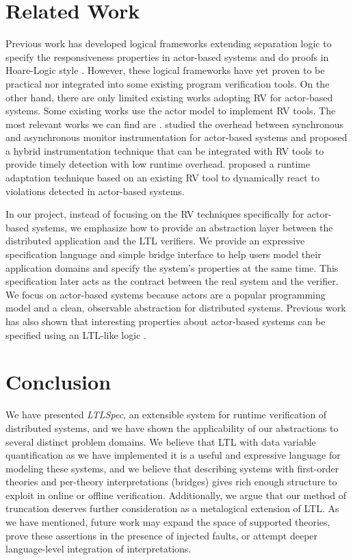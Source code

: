 \documentclass[format=acmsmall, nonacm=true, review=true, screen=true]{acmart}
\newcommand{\ltlspec}{\textit{LTLSpec}\xspace}
\begin{document}
\section{Related Work}

Previous work has developed logical frameworks extending separation logic to specify the responsiveness properties in actor-based systems and do proofs in Hoare-Logic style \cite{actorservice, parthasarathy2018modular}.
However, these logical frameworks have yet proven to be practical nor integrated into some existing program verification tools.
On the other hand, there are only limited existing works adopting RV for actor-based systems.
Some existing works \cite{shafiei2020actor,lavery2017actor} use the actor model to implement RV tools.
The most relevant works we can find are \cite{cassar2015synchronous,cassar2015runtime}.
\cite{cassar2015synchronous} studied the overhead between synchronous and asynchronous monitor instrumentation for actor-based systems and proposed a hybrid instrumentation technique that can be  integrated with RV tools to provide timely detection with low runtime overhead.
\cite{cassar2015runtime} proposed a runtime adaptation technique based on an existing RV tool to dynamically react to violations detected in actor-based systems.

In our project, instead of focusing on the RV techniques specifically for actor-based systems, we emphasize how to provide an abstraction layer between the distributed application and the LTL verifiers.
We provide an expressive specification language and simple bridge interface to help users model their application domains and specify the system's properties at the same time. This specification later acts as the contract between the real system and the verifier.
We focus on actor-based systems because actors are a popular programming model and a clean, observable abstraction for distributed systems.
Previous work has also shown that interesting properties about actor-based systems can be specified using an LTL-like logic \cite{actorservice, parthasarathy2018modular}.

\section{Conclusion}

We have presented \ltlspec, an extensible system for runtime verification of distributed systems, and we have shown the applicability of our abstractions to several distinct problem domains. We believe that LTL with data variable quantification as we have implemented it is a useful and expressive language for modeling these systems, and we believe that describing systems with first-order theories and per-theory interpretations (bridges) gives rich enough structure to exploit in online or offline verification. Additionally, we argue that our method of truncation deserves further consideration as a metalogical extension of LTL. As we have mentioned, future work may expand the space of supported theories, prove these assertions in the presence of injected faults, or attempt deeper language-level integration of interpretations.



\end{document}

